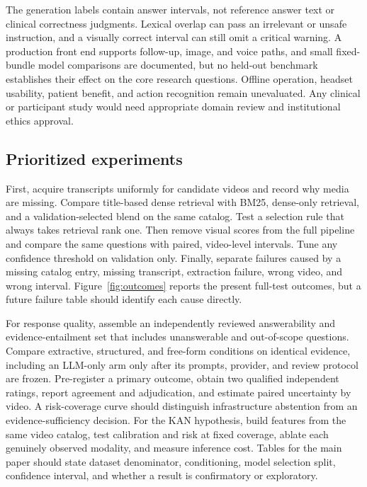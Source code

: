\documentclass[sigconf,authorversion,nonacm]{acmart}
\begin{document}
The generation labels contain answer intervals, not reference answer text or clinical correctness judgments. Lexical overlap can pass an irrelevant or unsafe instruction, and a visually correct interval can still omit a critical warning. A production front end supports follow-up, image, and voice paths, and small fixed-bundle model comparisons are documented, but no held-out benchmark establishes their effect on the core research questions. Offline operation, headset usability, patient benefit, and action recognition remain unevaluated. Any clinical or participant study would need appropriate domain review and institutional ethics approval.

\subsection{Prioritized experiments}
First, acquire transcripts uniformly for candidate videos and record why media are missing. Compare title-based dense retrieval with BM25, dense-only retrieval, and a validation-selected blend on the same catalog. Test a selection rule that always takes retrieval rank one. Then remove visual scores from the full pipeline and compare the same questions with paired, video-level intervals. Tune any confidence threshold on validation only. Finally, separate failures caused by a missing catalog entry, missing transcript, extraction failure, wrong video, and wrong interval. Figure~\ref{fig:outcomes} reports the present full-test outcomes, but a future failure table should identify each cause directly.

For response quality, assemble an independently reviewed answerability and evidence-entailment set that includes unanswerable and out-of-scope questions. Compare extractive, structured, and free-form conditions on identical evidence, including an LLM-only arm only after its prompts, provider, and review protocol are frozen. Pre-register a primary outcome, obtain two qualified independent ratings, report agreement and adjudication, and estimate paired uncertainty by video. A risk-coverage curve should distinguish infrastructure abstention from an evidence-sufficiency decision. For the KAN hypothesis, build features from the same video catalog, test calibration and risk at fixed coverage, ablate each genuinely observed modality, and measure inference cost. Tables for the main paper should state dataset denominator, conditioning, model selection split, confidence interval, and whether a result is confirmatory or exploratory.
\end{document}
